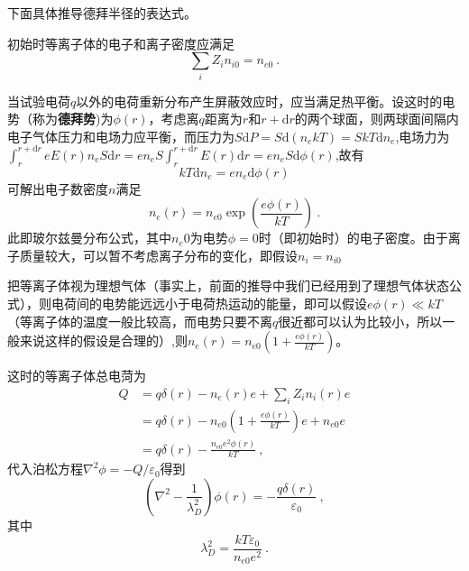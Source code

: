 			下面具体推导德拜半径的表达式。
			
			初始时等离子体的电子和离子密度应满足
			\begin{equation}\label{key}
			\sum_i Z_i n_{i0}=n_{e0}~.
			\end{equation}
			
			当试验电荷$q$以外的电荷重新分布产生屏蔽效应时，应当满足热平衡。设这时的电势（称为\textbf{德拜势})为$\phi(r)$，考虑离$q$距离为$r$和$r+\mathrm{d} r$的两个球面，则两球面间隔内电子气体压力和电场力应平衡，而压力为$S\mathrm{d}P=S\mathrm{d}(n_ekT)=SkT\mathrm{d}n_e$,电场力为$\int_r^{r+\mathrm{d}r} eE(r)n_eS\mathrm{d}r=en_eS\int_r^{r+\mathrm{d}r}E(r)\mathrm{d}r=en_eS\mathrm{d}\phi(r)$,故有
			\begin{equation}\label{key}
			kT\mathrm{d}n_e=en_e\mathrm{d}\phi(r)
			\end{equation}
			可解出电子数密度$n$满足
			\begin{equation}\label{key}
			n_e(r)=n_{e0}\exp{\left( \frac{e\phi(r)}{kT}\right)}~.
			\end{equation}
			此即玻尔兹曼分布公式，其中$n_e0$为电势$\phi=0$时（即初始时）的电子密度。由于离子质量较大，可以暂不考虑离子分布的变化，即假设$n_i=n_{i0}$
			
			把等离子体视为理想气体（事实上，前面的推导中我们已经用到了理想气体状态公式），则电荷间的电势能远远小于电荷热运动的能量，即可以假设$e\phi(r)\ll kT$（等离子体的温度一般比较高，而电势只要不离$q$很近都可以认为比较小，所以一般来说这样的假设是合理的）,则$n_e(r)=n_{e0}(1+\frac{e\phi(r)}{kT})$。
			
			这时的等离子体总电菏为
			\begin{equation}
			\begin{aligned}\label{key}
			Q&=q\delta(r)-n_e(r)e+\sum_{i} Z_i n_{i}(r)e\\
			&=q\delta(r)-n_{e0}(1+\frac{e\phi(r)}{kT})e+n_{e0}e\\
			&=q\delta(r)-\frac{n_{e0}e^2\phi(r)}{kT}~,
			\end{aligned}
			\end{equation}
			代入泊松方程$\nabla^2\phi=-Q/\varepsilon_0$得到
			\begin{equation}\label{key}
			(\nabla^2-\frac{1}{\lambda_D^2})\phi(r)=-\frac{q\delta(r)}{\varepsilon_0}~,
			\end{equation}
			其中
			\begin{equation}
				\boxed{\lambda_D^2=\frac{kT\varepsilon_0}{n_{e0}e^2}}~.
			\end{equation}
			
